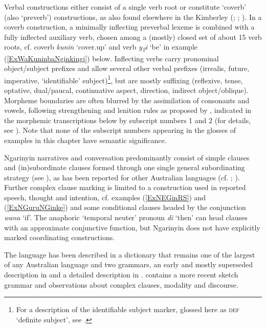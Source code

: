 \documentclass[output=paper,colorlinks,citecolor=brown]{langscibook}
\begin{document}
Verbal constructions either consist of a single verb root or constitute `coverb' (also `preverb') constructions, as also found elsewhere in the Kimberley (\citealt{SchulzeBerndt2000}; \citealt{McGregor2002}; \citealt{Bowern2010}). In a coverb construction, a minimally inflecting preverbal lexeme is combined with a fully inflected auxiliary verb, chosen among a (mostly) closed set of about 15 verb roots, cf. coverb \textit{kunin} ‘cover.up’ and verb \textit{y\textsubscript{2}i} ‘be’ in example (\ref{ExWaKuninbaNginkingi}) below. Inflecting verbs carry pronominal object/subject prefixes and allow several other verbal prefixes (irrealis, future, imperative, `identifiable' subject)\footnote{For a description of the identifiable subject marker, glossed here as \textsc{def} `definite subject', see \citet{Spronck2020}.}, but are mostly suffixing (reflexive, tense, optative, dual/paucal, continuative aspect, direction, indirect object/oblique). Morpheme boundaries are often blurred by the assimilation of consonants and vowels, following strengthening and lenition rules as proposed by \citet{Rumsey1982}, indicated in the morphemic transcriptions below by subscript numbers 1 and 2 (for details, see \citealp[17--24]{Rumsey1982}). Note that none of the subscript numbers appearing in the glosses of examples in this chapter have semantic significance.

\hspace*{-1pt}Ngarinyin narratives and conversation predominantly consist of simple clauses and (in)subordinate clauses formed through one single general subordinating strategy (see ), as has been reported for other Australian languages (cf. \citealt{Hale1976}; \citealt{Nordlinger2006}). Further complex clause marking is limited to a construction used in reported speech, thought and intention, cf. examples (\ref{ExNEGinRS}) and (\ref{ExNGuruNGinke}) \citep{Spronck2015} and some conditional clauses headed by the conjunction \textit{wana} `if'. The anaphoric `temporal neuter' pronoun \textit{di} `then' can head clauses with an approximate conjunctive function, but Ngarinyin does not have explicitly marked coordinating constructions.

The language has been described in a dictionary that remains one of the largest of any Australian language \citep{CoatElkin1974} and two grammars, an early and mostly superseded description in \citet{CoateOates1970} and a detailed description in \citet{Rumsey1982}. \citet{Spronck2015} contains a more recent sketch grammar and observations about complex clauses, modality and discourse.
\end{document}

